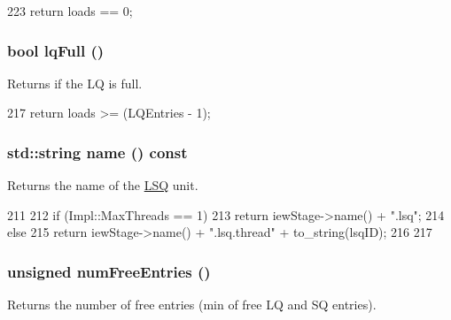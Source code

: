 \begin{DoxyCode}
223 { return loads == 0; }
\end{DoxyCode}
\hypertarget{classLSQUnit_a5893daf623130be826f492bbff58f757}{
\subsubsection[{lqFull}]{\setlength{\rightskip}{0pt plus 5cm}bool lqFull ()}}
\label{classLSQUnit_a5893daf623130be826f492bbff58f757}
Returns if the LQ is full. 


\begin{DoxyCode}
217 { return loads >= (LQEntries - 1); }
\end{DoxyCode}
\hypertarget{classLSQUnit_a37627d5d5bba7f4a8690c71c2ab3cb07}{
\subsubsection[{name}]{\setlength{\rightskip}{0pt plus 5cm}std::string name () const}}
\label{classLSQUnit_a37627d5d5bba7f4a8690c71c2ab3cb07}
Returns the name of the \hyperlink{classLSQ}{LSQ} unit. 


\begin{DoxyCode}
211 {
212     if (Impl::MaxThreads == 1) {
213         return iewStage->name() + ".lsq";
214     } else {
215         return iewStage->name() + ".lsq.thread" + to_string(lsqID);
216     }
217 }
\end{DoxyCode}
\hypertarget{classLSQUnit_a028971a565aca048c67ea1c36a6a9d51}{
\subsubsection[{numFreeEntries}]{\setlength{\rightskip}{0pt plus 5cm}unsigned numFreeEntries ()}}
\label{classLSQUnit_a028971a565aca048c67ea1c36a6a9d51}
Returns the number of free entries (min of free LQ and SQ entries). 


